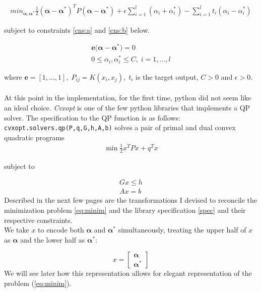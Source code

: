 \documentclass[12pt,twoside,notitlepage]{report}
\begin{document}
\begin{gather}\label{eq:minim}
  min_{\bm{\alpha},\bm{\alpha^*}} \frac{1}{2}(\bm{\alpha-\alpha^*})^T P (\bm{\alpha - \alpha^*})+\epsilon 
\sum_{i=1}^{l}(\alpha_i+\alpha_i^*)-\sum_{i=1}^{l}t_i(\alpha_i-\alpha_i^*)
\end{gather}

subject to constraints \ref{cns:a} and \ref{cns:b} below.

\begin{gather}
  \mathbf{e(\bm{\alpha}}-\bm{\alpha^*})=0 \label{cns:a}\\
  0\leq \alpha_i,\alpha_i^* \leq C, \;i=1,...,l \label{cns:b}
 \end{gather}

where
\(\mathbf{e}=[1,...,1],\;P_{ij}=K(x_i,x_j),\;t_i\) is the target output, \(C >
0\) and \(\epsilon > 0.\)
\paragraph*{}
At this point in the implementation, for the first time, python did not seem
like an ideal choice.  \textit{Cvxopt} is one of the few python libraries that
implements a QP solver. The specification to the QP function is as follows:
\texttt{cvxopt.solvers.qp(P,q,G,h,A,b)} solves a pair of primal and dual convex
quadratic programs
\begin{gather} \label{spec}
  \min \frac{1}{2} x^T P x + q^T x
\end{gather}

 subject to

\begin{gather}
 G x \leq h\\
  Ax = b
\end{gather}
Described in the next few pages are the transformations I devised to reconcile
the minimization problem \ref{eq:minim} and the library specification
\ref{spec} and their respective constraints.\\
We take \(x\) to encode both \(\bm{\alpha}\) and \(\bm{\alpha^*}\)
simultaneously, treating the upper half of \(x\) as \(\bm{\alpha}\) and the
lower half as \(\bm{\alpha^*}\):


\[x =
  \begin{bmatrix}
    \bm{ \alpha} \\
    \bm{ \alpha^*}
  \end{bmatrix}
\]
We will see later how this representation allows for elegant representation of
the problem (\ref{eq:minim}).
\end{document}
